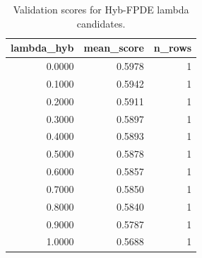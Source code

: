 \begin{table}[t]
\caption{Validation scores for Hyb-FPDE lambda candidates.}
\label{tab:lambda_distribution_computed}
\centering
\begin{tabular}{rrr}
\toprule
lambda\_hyb & mean\_score & n\_rows \\
\midrule
0.0000 & 0.5978 & 1 \\
0.1000 & 0.5942 & 1 \\
0.2000 & 0.5911 & 1 \\
0.3000 & 0.5897 & 1 \\
0.4000 & 0.5893 & 1 \\
0.5000 & 0.5878 & 1 \\
0.6000 & 0.5857 & 1 \\
0.7000 & 0.5850 & 1 \\
0.8000 & 0.5840 & 1 \\
0.9000 & 0.5787 & 1 \\
1.0000 & 0.5688 & 1 \\
\bottomrule
\end{tabular}

\end{table}
